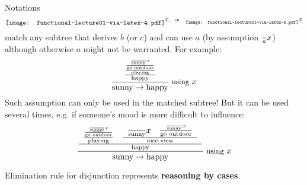 \documentclass{beamer}
\newcommand{\tmstrong}[1]{\textbf{#1}}
\begin{document}
{{\begin{frame}
\end{frame}}{\begin{frame}
  Notations
  \[ 
     \raisebox{-0.764310582139098\height}{\texttt{[image: functional-lecture01-via-latex-4.pdf]}}
     \scriptsize{x} \text{, \ \ or \ \ }
     \raisebox{-0.763902781908135\height}{\texttt{[image: functional-lecture01-via-latex-5.pdf]}}
     \scriptsize{x} \]
  match any subtree that derives $b$ (or $c$) and can use $a$ (by assumption
  $\frac{}{a} \scriptsize{x}$) although otherwise $a$ might not be warranted.
  For example:
  \[ \frac{\frac{\frac{\frac{\frac{}{\text{sunny}} \small{x}}{\text{go
     outdoor}}}{\text{playing}}}{\text{happy}}}{\text{sunny} \rightarrow
     \text{happy}} \small{\text{ using } x} \]
  Such assumption can only be used in the matched subtree! But it can be used
  several times, e.g. if someone's mood is more difficult to influence:
  \[ \frac{\frac{\begin{array}{ll}
       \frac{\frac{\frac{}{\text{sunny}} \small{x}}{\text{go
       outdoor}}}{\text{playing}} & \frac{\begin{array}{ll}
         \frac{}{\text{sunny}} \small{x} & \frac{\frac{}{\text{sunny}}
         \small{x}}{\text{go outdoor}}
       \end{array}}{\text{nice view}}
     \end{array}}{\text{happy}}}{\text{sunny} \rightarrow \text{happy}}
     \small{\text{ using } x} \]
\end{frame}}{\begin{frame}
  Elimination rule for disjunction represents {\tmstrong{reasoning by cases}}.
  

\end{frame}}}
\end{document}
